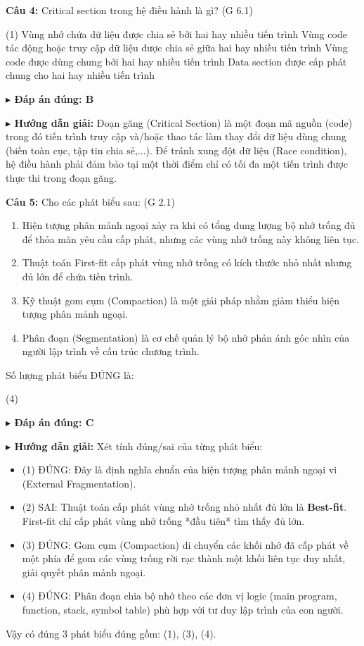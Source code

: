\documentclass[11pt,a4paper]{article}
\newcommand{\giaithich}[2]{%
    \par\vspace{0.15cm}\noindent
    \begingroup\small
    \noindent\textbf{\color{blue}$\blacktriangleright$ Đáp án đúng: #1} \par\vspace{0.08cm}
    \noindent\textbf{\color{teal}$\blacktriangleright$ Hướng dẫn giải:} #2
    \endgroup\par\vspace{0.35cm}
}
\begin{document}
\noindent\textbf{Câu 4:} Critical section trong hệ điều hành là gì? (G 6.1)
\begin{tasks}(1)
    \task Vùng nhớ chứa dữ liệu được chia sẻ bởi hai hay nhiều tiến trình
    \task Vùng code tác động hoặc truy cập dữ liệu được chia sẻ giữa hai hay nhiều tiến trình
    \task Vùng code được dùng chung bởi hai hay nhiều tiến trình
    \task Data section được cấp phát chung cho hai hay nhiều tiến trình
\end{tasks}
\giaithich{B}{Đoạn găng (Critical Section) là một đoạn mã nguồn (code) trong đó tiến trình truy cập và/hoặc thao tác làm thay đổi dữ liệu dùng chung (biến toàn cục, tập tin chia sẻ,...). Để tránh xung đột dữ liệu (Race condition), hệ điều hành phải đảm bảo tại một thời điểm chỉ có tối đa một tiến trình được thực thi trong đoạn găng.}

\noindent\textbf{Câu 5:} Cho các phát biểu sau: (G 2.1)
\begin{enumerate}[label=(\arabic*),noitemsep,topsep=1pt]
    \item Hiện tượng phân mảnh ngoại xảy ra khi có tổng dung lượng bộ nhớ trống đủ để thỏa mãn yêu cầu cấp phát, nhưng các vùng nhớ trống này không liên tục.
    \item Thuật toán First-fit cấp phát vùng nhớ trống có kích thước nhỏ nhất nhưng đủ lớn để chứa tiến trình.
    \item Kỹ thuật gom cụm (Compaction) là một giải pháp nhằm giảm thiểu hiện tượng phân mảnh ngoại.
    \item Phân đoạn (Segmentation) là cơ chế quản lý bộ nhớ phản ánh góc nhìn của người lập trình về cấu trúc chương trình.
\end{enumerate}
Số lượng phát biểu ĐÚNG là:
\begin{tasks}(4)
\end{tasks}
\giaithich{C}{Xét tính đúng/sai của từng phát biểu:
\begin{itemize}[noitemsep,topsep=1pt]
    \item (1) ĐÚNG: Đây là định nghĩa chuẩn của hiện tượng phân mảnh ngoại vi (External Fragmentation).
    \item (2) SAI: Thuật toán cấp phát vùng nhớ trống nhỏ nhất đủ lớn là \textbf{Best-fit}. First-fit chỉ cấp phát vùng nhớ trống *đầu tiên* tìm thấy đủ lớn.
    \item (3) ĐÚNG: Gom cụm (Compaction) di chuyển các khối nhớ đã cấp phát về một phía để gom các vùng trống rời rạc thành một khối liên tục duy nhất, giải quyết phân mảnh ngoại.
    \item (4) ĐÚNG: Phân đoạn chia bộ nhớ theo các đơn vị logic (main program, function, stack, symbol table) phù hợp với tư duy lập trình của con người.
\end{itemize}
Vậy có đúng 3 phát biểu đúng gồm: (1), (3), (4).}
\end{document}
